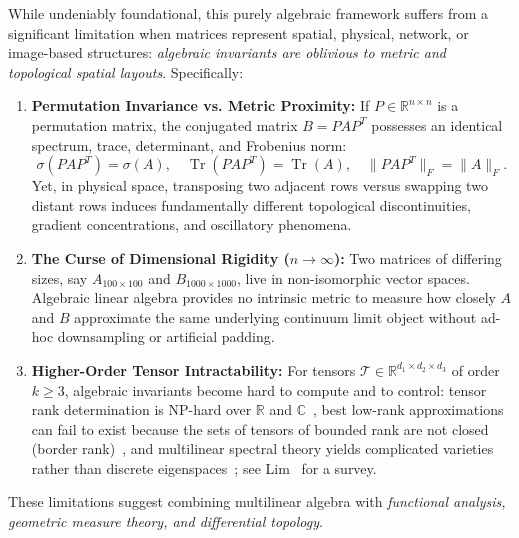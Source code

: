 \documentclass[11pt,a4paper,reqno]{amsart}
\theoremstyle{definition}
\numberwithin{equation}{section}
\newcommand{\R}{\mathbb{R}}
\newcommand{\C}{\mathbb{C}}
\newcommand{\Tr}{\operatorname{Tr}}
\begin{document}
While undeniably foundational, this purely algebraic framework suffers from a significant limitation when matrices represent spatial, physical, network, or image-based structures: \emph{algebraic invariants are oblivious to metric and topological spatial layouts}. Specifically:
\begin{enumerate}[label=(\alph*)]
    \item \textbf{Permutation Invariance vs. Metric Proximity:} If $P \in \R^{n \times n}$ is a permutation matrix, the conjugated matrix $B = P A P^T$ possesses an identical spectrum, trace, determinant, and Frobenius norm:
    \begin{equation}
        \sigma(P A P^T) = \sigma(A), \quad \Tr(P A P^T) = \Tr(A), \quad \|P A P^T\|_F = \|A\|_F.
    \end{equation}
    Yet, in physical space, transposing two adjacent rows versus swapping two distant rows induces fundamentally different topological discontinuities, gradient concentrations, and oscillatory phenomena.
    \item \textbf{The Curse of Dimensional Rigidity ($n \to \infty$):} Two matrices of differing sizes, say $A_{100 \times 100}$ and $B_{1000 \times 1000}$, live in non-isomorphic vector spaces. Algebraic linear algebra provides no intrinsic metric to measure how closely $A$ and $B$ approximate the same underlying continuum limit object without ad-hoc downsampling or artificial padding.
    \item \textbf{Higher-Order Tensor Intractability:} For tensors $\mathcal{T} \in \R^{d_1 \times d_2 \times d_3}$ of order $k \ge 3$, algebraic invariants become hard to compute and to control: tensor rank determination is NP-hard over $\R$ and $\C$~\cite{hillar2013most}, best low-rank approximations can fail to exist because the sets of tensors of bounded rank are not closed (border rank)~\cite{desilva2008illposed}, and multilinear spectral theory yields complicated varieties rather than discrete eigenspaces~\cite{lim2005singular,qi2005eigenvalues,cartwright2013number}; see Lim~\cite{lim2021tensors} for a survey.
\end{enumerate}

These limitations suggest combining multilinear algebra with \emph{functional analysis, geometric measure theory, and differential topology}.
\end{document}
